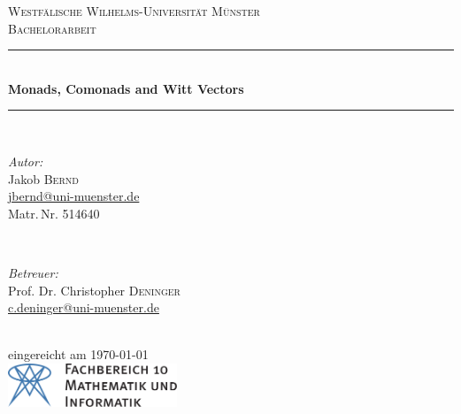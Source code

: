 \documentclass[a4paper,index=totoc,toc=bibliography,fontsize=10,DIV=13,headinclude,twoside,BCOR=12mm,cleardoublepage=empty,headsepline=1pt,draft]{scrreprt}
\begin{document}
\begin{titlepage}
	\newcommand{\HRule}{\rule{\linewidth}{0.5mm}} %

	\center %
 

	\textsc{\LARGE Westfälische Wilhelms-Universität Münster}\\[1.5cm] %
	\textsc{\Large Bachelorarbeit}\\[0.5cm] %


	\HRule \\[0.4cm]
	
	{\onehalfspacing\huge\sffamily\bfseries Monads, Comonads and Witt Vectors \singlespacing} %
	\vspace{-0.4cm}
	\HRule \\[1.5cm] 
	

	\begin{minipage}[t]{0.4\textwidth}
	\begin{flushleft} \large
	\emph{Autor:}\\
	Jakob \textsc{Bernd}\\ %
	\normalsize \url{jbernd@uni-muenster.de}\\
	Matr.\,Nr. 514640
	\end{flushleft}
	\end{minipage}
	~
	\begin{minipage}[t]{0.4\textwidth}
	\begin{flushright} \large
	\emph{Betreuer:} \\
	Prof. Dr. Christopher \textsc{Deninger}\\ %
	\normalsize \url{c.deninger@uni-muenster.de}
	\end{flushright}
	\end{minipage}\\[4cm]

	{\large eingereicht am \today}\\[3cm] %


	\includegraphics[height=1.3cm,keepaspectratio]{resources/fb10logo.pdf}\\[1cm] %
 

	\vfill %
	
\end{titlepage}
\end{document}
